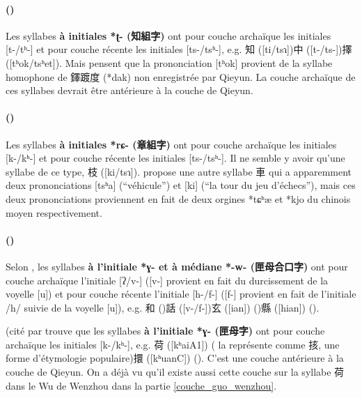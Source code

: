 \documentclass{scrbook}
\newcounter{c}[subsubsection]
\newcommand{\stpc}[1]{\stepcounter{#1}}
\newcommand{\termyyx}[1]{\textbf{#1}}
\begin{document}
\begin{sloppypar}
\stpc{c}\paragraph{()}
Les syllabes \termyyx{à initiales *ʈ- (知組字)} ont pour couche archaïque les initiales [t-/tʰ-] et pour couche récente les initiales [ts-/tsʰ-], e.g. 知 ([ti/tsɿ])中 ([t-/ts-])擇 ([tʰok/tsʰet]). Mais \textcite[76--77]{Zhuang2016zhi2} pensent que la prononciation [tʰok] provient de la syllabe homophone de 鐸踱度 (*dak) non enregistrée par Qieyun. La couche archaïque de ces syllabes devrait être antérieure à la couche de Qieyun.

\stpc{c}\paragraph{()}
Les syllabes \termyyx{à initiales *rɕ- (章組字)} ont pour couche archaïque les initiales [k-/kʰ-] et pour couche récente les initiales [ts-/tsʰ-]. Il ne semble y avoir qu'une syllabe de ce type, 枝 ([ki/tsɿ]). \textcite[24]{Yu1994meixian} propose une autre syllabe 車 qui a apparemment deux prononciations [tsʰa] (``véhicule'') et [ki] (``la tour du jeu d'échecs''), mais ces deux prononciations proviennent en fait de deux orgines *tɕʰæ et *kjo du chinois moyen respectivement.%

\stpc{c}\paragraph{()}
Selon \textcite[140--143]{Liu2009hakka_xia}, les syllabes \termyyx{à l'initiale *ɣ- et à médiane *-w- (匣母合口字)} ont pour couche archaïque l'initiale [ʔ/v-] ([v-] provient en fait du durcissement de la voyelle [u]) et pour couche récente l'initiale [h-/f-] ([f-] provient en fait de l'initiale /h/ suivie de la voyelle [u]), e.g. 和 (\cite[68, 70]{Huang1995Meixian})話 ([v-/f-])玄 ([ian]) (\cite[171]{Huang1995Meixian})縣 ([hian]) (\cite[11]{Huang1995Meixian}). 

\textcite{Yan2004hakka_xia} (cité par \textcite[147]{Liu2009hakka_xia} trouve que les syllabes \termyyx{à l'initiale *ɣ- (匣母字)} ont pour couche archaïque les initiales [k-/kʰ-], e.g. 荷 ([kʰaiA1]) (\cite[89]{Huang1995Meixian} la représente comme 㧡, une forme d'étymologie populaire)擐 ([kʰuanC]) (\cite[174]{Huang1995Meixian}). C'est une couche antérieure à la couche de Qieyun. On a déjà vu qu'il existe aussi cette couche sur la syllabe 荷 dans le Wu de Wenzhou dans la partie \ref{couche_guo_wenzhou}.


\end{sloppypar}
\end{document}
